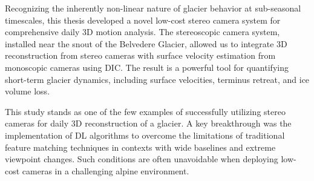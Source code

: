 
Recognizing the inherently non-linear nature of glacier behavior at sub-seasonal timescales, this thesis developed a novel low-cost stereo camera system for comprehensive daily 3D motion analysis.  
The stereoscopic camera system, installed near the snout of the Belvedere Glacier, allowed us to integrate 3D reconstruction from stereo cameras with surface velocity estimation from monoscopic cameras using DIC. 
The result is a powerful tool for quantifying short-term glacier dynamics, including surface velocities, terminus retreat, and ice volume loss.

This study stands as one of the few examples of successfully utilizing stereo cameras for daily 3D reconstruction of a glacier. 
A key breakthrough was the implementation of DL algorithms to overcome the limitations of traditional feature matching techniques in contexts with wide baselines and extreme viewpoint changes.  
Such conditions are often unavoidable when deploying low-cost cameras in a challenging alpine environment.

